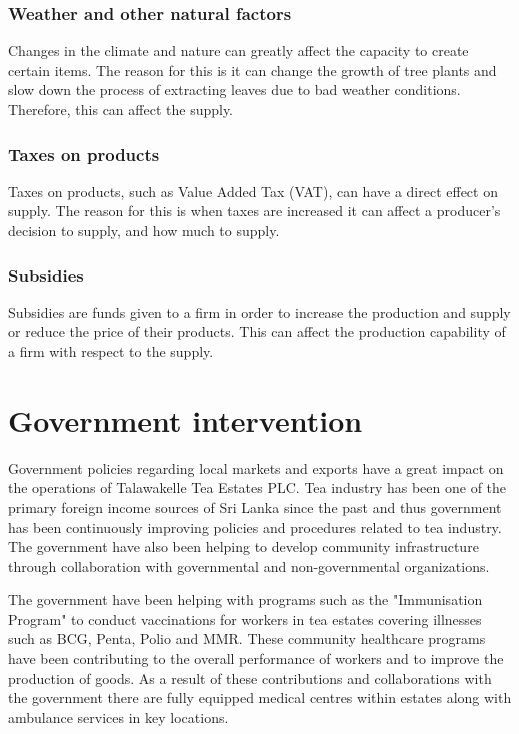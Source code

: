 \documentclass[12pt]{report}
\begin{document}
\subsection{Weather and other natural factors}
Changes in the climate and nature can greatly affect the capacity to create certain items. The reason for this is it can change the growth of tree plants and slow down the process of extracting leaves due to bad weather conditions. Therefore, this can affect the supply.

\subsection{Taxes on products}
Taxes on products, such as Value Added Tax (VAT), can have a direct effect on supply. The reason for this is when taxes are increased it can affect a producer’s decision to supply, and how much to supply.

\subsection{Subsidies}
Subsidies are funds given to a firm in order to increase the production and supply or reduce the price of their products. This can affect the production capability of a firm with respect to the supply.

\chapter{Government intervention}
Government policies regarding local markets and exports have a great impact on the operations of Talawakelle Tea Estates PLC. Tea industry has been one of the primary foreign income sources of Sri Lanka since the past and thus government has been continuously improving policies and procedures related to tea industry. The government have also been helping to develop community infrastructure through collaboration with governmental and non-governmental organizations.

The government have been helping with programs such as the "Immunisation Program" to conduct vaccinations for workers in tea estates covering illnesses such as BCG, Penta, Polio and MMR. These community healthcare programs have been contributing to the overall performance of workers and to improve the production of goods. As a result of these contributions and collaborations with the government there are fully equipped medical centres within estates along with ambulance services in key locations.
\end{document}

